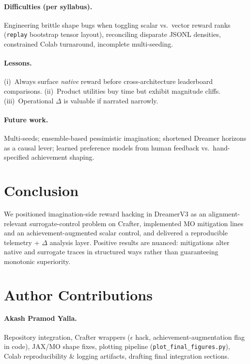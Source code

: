 \documentclass[10pt,twocolumn]{article}
\theoremstyle{definition}
\begin{document}
\paragraph{Difficulties (per syllabus).}
Engineering brittle shape bugs when toggling scalar vs.\ vector reward ranks (\texttt{replay} bootstrap tensor layout), reconciling disparate JSONL densities, constrained Colab turnaround, incomplete multi-seeding.

\paragraph{Lessons.}
(i)~Always surface \emph{native} reward before cross-architecture leaderboard comparisons. (ii)~Product utilities buy time but exhibit magnitude cliffs. (iii)~Operational \(\Delta\) is valuable if narrated narrowly.

\paragraph{Future work.}
Multi-seeds; ensemble-based pessimistic imagination; shortened Dreamer horizons as a causal lever; learned preference models from human feedback vs.\ hand-specified achievement shaping.

\section{Conclusion}
We positioned imagination-side reward hacking in DreamerV3 as an alignment-relevant surrogate-control problem on Crafter, implemented MO mitigation lines and an achievement-augmented scalar control, and delivered a reproducible telemetry + \(\Delta\) analysis layer. Positive results are nuanced: mitigations alter native and surrogate traces in structured ways rather than guaranteeing monotonic superiority.

\section*{Author Contributions}
\paragraph{Akash Pramod Yalla.}
Repository integration, Crafter wrappers (\(\epsilon\) hack, achievement-augmentation flag in code), JAX/MO shape fixes, plotting pipeline (\texttt{plot\_final\_figures.py}), Colab reproducibility \& logging artifacts, drafting final integration sections.
\end{document}

